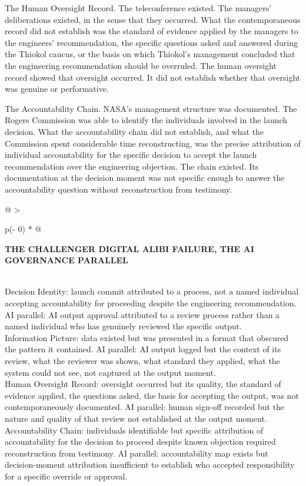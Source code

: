 The Human Oversight Record. The teleconference existed. The managers' deliberations existed, in the sense that they occurred. What the contemporaneous record did not establish was the standard of evidence applied by the managers to the engineers' recommendation, the specific questions asked and answered during the Thiokol caucus, or the basis on which Thiokol's management concluded that the engineering recommendation should be overruled. The human oversight record showed that oversight occurred. It did not establish whether that oversight was genuine or performative.

The Accountability Chain. NASA's management structure was documented. The Rogers Commission was able to identify the individuals involved in the launch decision. What the accountability chain did not establish, and what the Commission spent considerable time reconstructing, was the precise attribution of individual accountability for the specific decision to accept the launch recommendation over the engineering objection. The chain existed. Its documentation at the decision moment was not specific enough to answer the accountability question without reconstruction from testimony.

\begin{longtable}[]{@{}
  >{\raggedright\arraybackslash}p{(\columnwidth - 0\tabcolsep) * }@{}}
\toprule\noalign{}
\begin{minipage}[b]{\linewidth}\raggedright
\textbf{THE CHALLENGER DIGITAL ALIBI FAILURE, THE AI GOVERNANCE PARALLEL}
\end{minipage} \\
\midrule\noalign{}
\endhead
\bottomrule\noalign{}
\endlastfoot
Decision Identity: launch commit attributed to a process, not a named individual accepting accountability for proceeding despite the engineering recommendation. AI parallel: AI output approval attributed to a review process rather than a named individual who has genuinely reviewed the specific output. \\
Information Picture: data existed but was presented in a format that obscured the pattern it contained. AI parallel: AI output logged but the context of its review, what the reviewer was shown, what standard they applied, what the system could not see, not captured at the output moment. \\
Human Oversight Record: oversight occurred but its quality, the standard of evidence applied, the questions asked, the basis for accepting the output, was not contemporaneously documented. AI parallel: human sign-off recorded but the nature and quality of that review not established at the output moment. \\
Accountability Chain: individuals identifiable but specific attribution of accountability for the decision to proceed despite known objection required reconstruction from testimony. AI parallel: accountability map exists but decision-moment attribution insufficient to establish who accepted responsibility for a specific override or approval. \\
\end{longtable}

